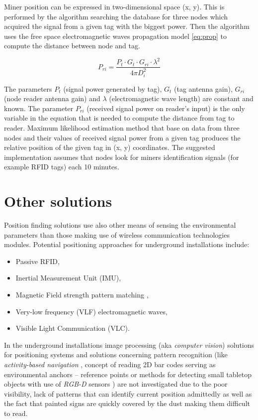 \documentclass[../main.tex]{subfiles}
\begin{document}
Miner position can be expressed in two-dimensional space (x, y). This is performed by the algorithm searching the database for three nodes which acquired the signal from a given tag with the biggest power. Then the algorithm uses the free space electromagnetic waves propagation model \eqref{eq:prop} to compute the distance between node and tag.

\begin{equation}
\label{eq:prop}
P_{ri}=\frac{P_t \cdot G_t \cdot G_{ri} \cdot \lambda^2}{4\pi D_i^2}
\end{equation}

The parameters $P_t$ (signal power generated by tag), $G_t$ (tag antenna gain), $G_{ri}$ (node reader antenna gain) and $\lambda$ (electromagnetic wave length) are constant and known. The parameter ${P_{ri}}$ (received signal power on reader's input) is the only variable in the equation that is needed to compute the distance from tag to reader. Maximum likelihood estimation method that base on data from three nodes and their values of received signal power from a given tag produces the relative position of the given tag in (x, y) coordinates. The suggested implementation \cite{WSN_tracking} assumes that nodes look for miners identification signals (for example RFID tags) each 10 minutes.

\section{Other solutions} %
\label{sec:other_solutions}

Position finding solutions use also other means of sensing the environmental parameters than those making use of wireless communication technologies modules. Potential positioning approaches for underground installations include:
\begin{itemize}
	\item Passive RFID,
	\item Inertial Measurement Unit (IMU),
	\item Magnetic Field strength pattern matching \cite{article_geomagn_navi_mine},
	\item Very-low frequency (VLF) electromagnetic waves,
	\item Visible Light Communication (VLC).
\end{itemize}

In the underground installations image processing (aka \textit{computer vision}) solutions for positioning systems and solutions concerning pattern recognition (like \textit{activity-based navigation} \cite{article_visual_points_AR_navi}, concept of reading 2D bar codes serving as environmental anchors -- reference points \cite{article_inertial_test_smartphone} or methods for detecting small tabletop objects with use of \textit{RGB-D} sensors \cite{article_sensors_for_indoor_navi}) are not investigated due to the poor visibility, lack of patterns that can identify current position admittedly as well as the fact that painted signs are quickly covered by the dust making them difficult to read.
\end{document}

